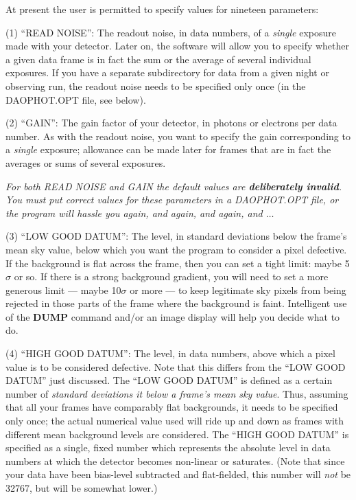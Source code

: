 At present the user is permitted to specify values for nineteen
parameters: 

\item{(1)}  ``READ NOISE'':  The readout noise, in data numbers, of a 
{\it single\/} exposure made with your detector.  Later on, the
software will allow you to specify whether a given data frame is in
fact the sum or the average of several individual exposures.  If you
have a separate subdirectory for data from a given night or observing
run, the readout noise needs to be specified only once (in the
DAOPHOT.OPT file, see below). 

\item{(2)}  ``GAIN'':  The gain factor of your detector, in photons or
electrons per data number.  As with the readout noise, you want to
specify the gain corresponding to a {\it single\/} exposure; allowance
can be made later for frames that are in fact the averages or sums of
several exposures.

\item{}  {\it For both READ NOISE and GAIN the default values are
{\bf deliberately invalid}.  You must put correct values for these
parameters in a DAOPHOT.OPT file, or the program will hassle you
again, and again, and again, and $\ldots$}

\item{(3)}  ``LOW GOOD DATUM'':  The level, in standard deviations
below the frame's mean sky value, below which you want the program to
consider a pixel defective.  If the background is flat across the
frame, then you can set a tight limit:  maybe 5$\sigma$ or so.  If
there is a strong background gradient, you will need to set a more
generous limit --- maybe 10$\sigma$ or more --- to keep legitimate sky
pixels from being rejected in those parts of the frame where the
background is faint.  Intelligent use of the {\bf DUMP} command and/or
an image display will help you decide what to do.

\item{(4)}  ``HIGH GOOD DATUM'':  The level, in data numbers, above
which a pixel value is to be considered defective.  Note that this
differs from the ``LOW GOOD DATUM'' just discussed.  The ``LOW GOOD
DATUM'' is defined as a certain number of {\it standard deviations it
below a frame's mean sky value\/}. Thus, assuming that all your frames
have comparably flat backgrounds, it needs to be specified only once;
the actual numerical value used will ride up and down as frames with
different mean background levels are considered.  The ``HIGH GOOD
DATUM'' is specified as a single, fixed number which represents the
absolute level in data numbers at which the detector becomes non-linear
or saturates.  (Note that since your data have been bias-level
subtracted and flat-fielded, this number will {\it not\/} be 32767, but
will be somewhat lower.)

